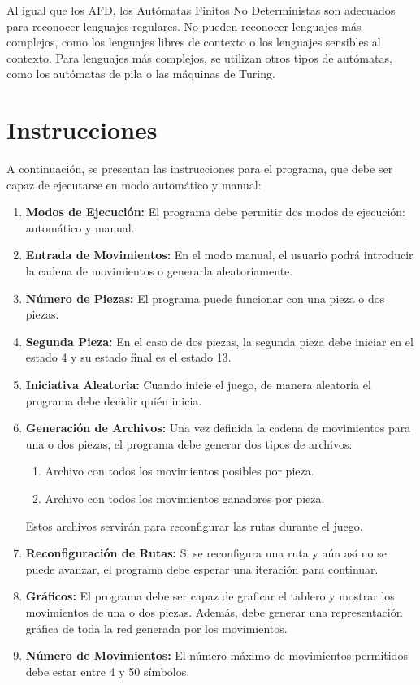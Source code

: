 \documentclass[11pt]{article} %
\begin{document}
Al igual que los AFD, los Autómatas Finitos No Deterministas son adecuados para reconocer lenguajes regulares. No pueden reconocer lenguajes más complejos, como los lenguajes libres de contexto o los lenguajes sensibles al contexto. Para lenguajes más complejos, se utilizan otros tipos de autómatas, como los autómatas de pila o las máquinas de Turing.
	
	
	\section{Instrucciones}
	
	A continuación, se presentan las instrucciones para el programa, que debe ser capaz de ejecutarse en modo automático y manual:
	
	\begin{enumerate}
		\item \textbf{Modos de Ejecución:} El programa debe permitir dos modos de ejecución: automático y manual.
		
		\item \textbf{Entrada de Movimientos:} En el modo manual, el usuario podrá introducir la cadena de movimientos o generarla aleatoriamente.
		
		\item \textbf{Número de Piezas:} El programa puede funcionar con una pieza o dos piezas.
		
		\item \textbf{Segunda Pieza:} En el caso de dos piezas, la segunda pieza debe iniciar en el estado 4 y su estado final es el estado 13.
		
		\item \textbf{Iniciativa Aleatoria:} Cuando inicie el juego, de manera aleatoria el programa debe decidir quién inicia.
		
		\item \textbf{Generación de Archivos:} Una vez definida la cadena de movimientos para una o dos piezas, el programa debe generar dos tipos de archivos:
		
		\begin{enumerate}
			\item Archivo con todos los movimientos posibles por pieza.
			\item Archivo con todos los movimientos ganadores por pieza.
		\end{enumerate}
		
		Estos archivos servirán para reconfigurar las rutas durante el juego.
		
		\item \textbf{Reconfiguración de Rutas:} Si se reconfigura una ruta y aún así no se puede avanzar, el programa debe esperar una iteración para continuar.
		
		\item \textbf{Gráficos:} El programa debe ser capaz de graficar el tablero y mostrar los movimientos de una o dos piezas. Además, debe generar una representación gráfica de toda la red generada por los movimientos.
		
		\item \textbf{Número de Movimientos:} El número máximo de movimientos permitidos debe estar entre 4 y 50 símbolos.
	\end{enumerate}
	
\end{document}
